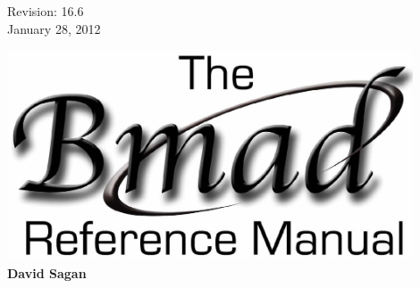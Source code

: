 \thispagestyle{empty}

\begin{flushright}
\large
  Revision: 16.6 \\
  January 28, 2012 \\
\end{flushright}

\vfill

{
\begin{center}
\includegraphics[width=12cm]{bmad-ref-manual.pdf} \\
\vskip 0.3in
\huge\bf David Sagan
\end{center}
}

\vfill
\break

